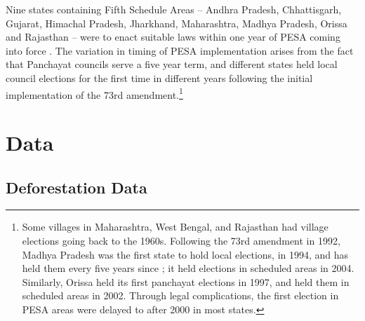 \documentclass[12pt,reqno]{article}
\begin{document}
Nine states containing Fifth Schedule Areas -- Andhra Pradesh, Chhattisgarh, Gujarat, Himachal Pradesh, Jharkhand, Maharashtra, Madhya Pradesh, Orissa and Rajasthan -- were to enact suitable laws within one year of PESA coming into force \parencite{Bijoy2012-gz}. The variation in timing of PESA implementation arises from the fact that Panchayat councils serve a five year term, and different states held local council elections for the first time in different years following the initial implementation of the 73rd amendment.\footnote{Some villages in Maharashtra, West Bengal, and Rajasthan had village elections going back to the 1960s. Following the 73rd amendment in 1992, Madhya Pradesh was the first state to hold local elections, in 1994, and has held them every five years since \parencite{Commonwealth_Human_Rights_Initiative2006-vo}; it held elections in scheduled areas in 2004. Similarly, Orissa held its first panchayat elections in 1997, and held them in scheduled areas in 2002. Through legal complications, the first election in PESA areas were delayed to after 2000 in most states.}


















\section{Data} %
\label{sec:data}

\subsection{Deforestation Data} %
\label{sub:deforestation_data}
\end{document}
